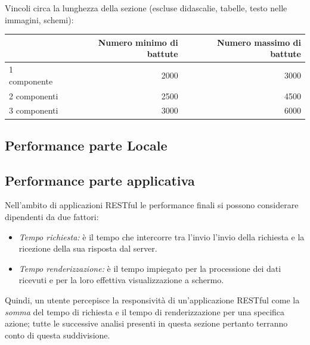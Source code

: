 \documentclass[12pt]{article}
\begin{document}
Vincoli circa la lunghezza della sezione (escluse didascalie, tabelle, testo nelle immagini, schemi):

\vspace{1cm}
\begin{tabular}{l|rr}
 & Numero minimo di battute & Numero massimo di battute \\
 \hline
 1 componente & 2000 & 3000 \\
 2 componenti & 2500 & 4500 \\
 3 componenti & 3000 & 6000 \\
 \hline
\end{tabular}


\newpage
\subsection{Performance parte Locale}
\subsection{Performance parte applicativa}
Nell'ambito di applicazioni RESTful le performance finali si possono considerare dipendenti da due fattori:
\begin{itemize}
\item \textit{Tempo richiesta:} è il tempo che intercorre tra l'invio l'invio della richiesta e la ricezione della sua risposta dal server.
\item \textit{Tempo renderizzazione:} è il tempo impiegato per la processione dei dati ricevuti e per la loro effettiva visualizzazione a schermo.
\end{itemize}
Quindi, un utente percepisce la responsività di un'applicazione RESTful come la \textit{somma} del tempo di richiesta e il tempo di renderizzazione per una specifica azione; tutte le successive analisi presenti in questa sezione pertanto terranno conto di questa suddivisione.
\end{document}
